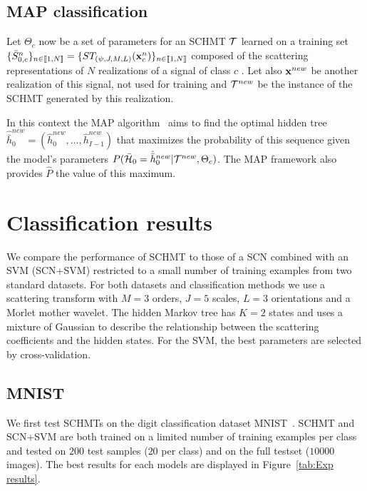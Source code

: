 \documentclass{article}
\begin{document}
  \vspace{-5pt}
	\subsection{MAP classification}
    \label{subsec:SCN/MAP}
    \vspace{-5pt}
    Let $\Theta_{c}$ now be a set of parameters for an SCHMT $\mathcal{T}$ learned on a training set $\{\bar{S}_{0,c}^n\}_{n \in \llbracket1, N \rrbracket} = \{ST_{(\psi, J, M, L)}({\bf x}_{c}^{n})\}_{n \in \llbracket1, N \rrbracket}$ composed of the scattering representations of $N$ realizations of a signal of class $c$ . Let also ${\bf x}^{new}$ be another realization of this signal, not used for training and $\mathcal{T}^{new}$ be the instance of the SCHMT generated by this realization.

    In this context the MAP algorithm~\cite{durand2001statistical} aims to find the optimal hidden tree $\hat{\bar{h}}_{0}^{new}=(\hat{h}_{0}^{new}, \ldots , \hat{h}_{I-1}^{new})$ that maximizes the probability of this sequence given the model's parameters $P(\bar{\mathcal{H}}_{0}= \hat{\bar{h}}_{0}^{new}|\mathcal{T}^{new},\Theta_{c})$. The MAP framework also provides $\hat{P}$ the value of this maximum.
    
\section{Classification results}
  \label{sec:Exps}
  \vspace{-5pt}
  We compare the performance of SCHMT to those of a SCN combined with an SVM (SCN+SVM) restricted to a small number of training examples from two standard datasets. For both datasets and classification methods we use a scattering transform with $M=3$ orders, $J=5$ scales, $L=3$ orientations and a Morlet mother wavelet. The hidden Markov tree has $K=2$ states and uses a mixture of Gaussian to describe the relationship between the scattering coefficients and the hidden states. For the SVM, the best parameters are selected by cross-validation.
  
  \vspace{-5pt}
  \subsection{MNIST}
		\label{subsec:Exps/MNIST}
		\vspace{-5pt}
		We first test SCHMTs on the digit classification dataset MNIST~\cite{lecun2016web}. SCHMT and SCN+SVM are both trained on a limited number of training examples per class and tested on $200$ test
  samples ($20$ per class) and on the full testset ($10000$ images). The best results for each models are displayed in Figure~\ref{tab:Exp results}.
\end{document}
